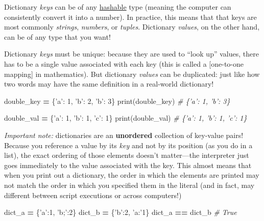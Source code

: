 \documentclass[]{book}
\newenvironment{Shaded}{\begin{snugshade}}{\end{snugshade}}
\newcommand{\DecValTok}[1]{\textcolor[rgb]{0.00,0.00,0.81}{#1}}
\newcommand{\StringTok}[1]{\textcolor[rgb]{0.31,0.60,0.02}{#1}}
\newcommand{\CommentTok}[1]{\textcolor[rgb]{0.56,0.35,0.01}{\textit{#1}}}
\newcommand{\OperatorTok}[1]{\textcolor[rgb]{0.81,0.36,0.00}{\textbf{#1}}}
\newcommand{\BuiltInTok}[1]{#1}
\newcommand{\NormalTok}[1]{#1}
\begin{document}
Dictionary \emph{keys} can be of any
\href{https://en.wikipedia.org/wiki/Hash_function}{hashable} type
(meaning the computer can consistently convert it into a number). In
practice, this means that that keys are most commonly \emph{strings},
\emph{numbers}, or \emph{tuples}. Dictionary \emph{values}, on the other
hand, can be of any type that you want!

Dictionary \emph{keys} must be unique: because they are used to ``look
up'' values, there has to be a single value associated with each key
(this is called a {[}one-to-one mapping{]} in mathematics). But
dictionary \emph{values} can be duplicated: just like how two words may
have the same definition in a real-world dictionary!

\begin{Shaded}
\begin{Highlighting}[]
\NormalTok{double_key }\OperatorTok{=}\NormalTok{ \{}\StringTok{'a'}\NormalTok{: }\DecValTok{1}\NormalTok{, }\StringTok{'b'}\NormalTok{: }\DecValTok{2}\NormalTok{, }\StringTok{'b'}\NormalTok{: }\DecValTok{3}\NormalTok{\}}
\BuiltInTok{print}\NormalTok{(double_key)  }\CommentTok{# \{'a': 1, 'b': 3\}}

\NormalTok{double_val }\OperatorTok{=}\NormalTok{ \{}\StringTok{'a'}\NormalTok{: }\DecValTok{1}\NormalTok{, }\StringTok{'b'}\NormalTok{: }\DecValTok{1}\NormalTok{, }\StringTok{'c'}\NormalTok{: }\DecValTok{1}\NormalTok{\}}
\BuiltInTok{print}\NormalTok{(double_val)  }\CommentTok{# \{'a': 1, 'b': 1, 'c': 1\}}
\end{Highlighting}
\end{Shaded}

\emph{Important note:} dictionaries are an \textbf{unordered} collection
of key-value pairs! Because you reference a value by its \emph{key} and
not by its position (as you do in a list), the exact ordering of those
elements doesn't matter---the interpreter just goes immediately to the
value associated with the key. This almost means that when you print out
a dictionary, the order in which the elements are printed may not match
the order in which you specified them in the literal (and in fact, may
different between script executions or across computers!)

\begin{Shaded}
\begin{Highlighting}[]
\NormalTok{dict_a }\OperatorTok{=}\NormalTok{ \{}\StringTok{'a'}\NormalTok{:}\DecValTok{1}\NormalTok{, }\StringTok{'b;'}\NormalTok{:}\DecValTok{2}\NormalTok{\}}
\NormalTok{dict_b }\OperatorTok{=}\NormalTok{ \{}\StringTok{'b'}\NormalTok{:}\DecValTok{2}\NormalTok{, }\StringTok{'a:'}\DecValTok{1}\NormalTok{\}}
\NormalTok{dict_a }\OperatorTok{==}\NormalTok{ dict_b  }\CommentTok{# True}
\end{Highlighting}
\end{Shaded}
\end{document}
